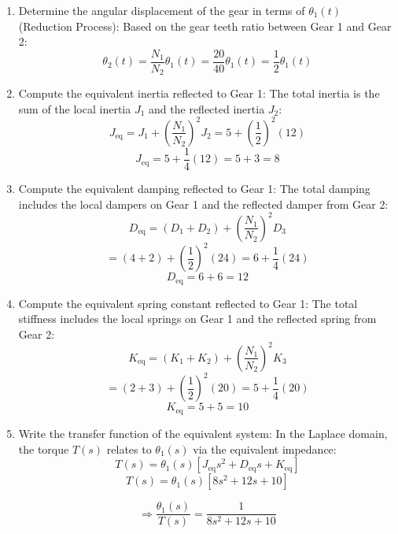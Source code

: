 \documentclass[11pt]{article}
\begin{document}
\begin{enumerate}[label=(\alph*), itemindent=*, leftmargin=*, nolistsep]
    \item Determine the angular displacement of the gear in terms of \( \theta_1(t) \) (Reduction Process):
    Based on the gear teeth ratio between Gear 1 and Gear 2:
    \[
    \theta_2(t) = \frac{N_1}{N_2} \theta_1(t) = \frac{20}{40} \theta_1(t) = \frac{1}{2} \theta_1(t)
    \]

    \item Compute the equivalent inertia reflected to Gear 1:
    The total inertia is the sum of the local inertia $J_1$ and the reflected inertia $J_2$:
    \[
    J_{\text{eq}} = J_1 + \left(\frac{N_1}{N_2}\right)^2 J_2 = 5 + \left(\frac{1}{2}\right)^2 (12)
    \]
    \[
    J_{\text{eq}} = 5 + \frac{1}{4}(12) = 5 + 3 = \boxed{8}
    \]

    \item Compute the equivalent damping reflected to Gear 1:
    The total damping includes the local dampers on Gear 1 and the reflected damper from Gear 2:
    \[
    D_{\text{eq}} = (D_1 + D_2) + \left(\frac{N_1}{N_2}\right)^2 D_3
    \]
    \[
    = (4 + 2) + \left(\frac{1}{2}\right)^2 (24) = 6 + \frac{1}{4}(24)
    \]
    \[
    D_{\text{eq}} = 6 + 6 = \boxed{12}
    \]

    \item Compute the equivalent spring constant reflected to Gear 1:
    The total stiffness includes the local springs on Gear 1 and the reflected spring from Gear 2:
    \[
    K_{\text{eq}} = (K_1 + K_2) + \left(\frac{N_1}{N_2}\right)^2 K_3
    \]
    \[
    = (2 + 3) + \left(\frac{1}{2}\right)^2 (20) = 5 + \frac{1}{4}(20)
    \]
    \[
    K_{\text{eq}} = 5 + 5 = \boxed{10}
    \]

    \item Write the transfer function of the equivalent system:
    In the Laplace domain, the torque $T(s)$ relates to $\theta_1(s)$ via the equivalent impedance:
    \[
    T(s) = \theta_1(s) \left[ J_{\text{eq}} s^2 + D_{\text{eq}} s + K_{\text{eq}} \right]
    \]
    \[
    T(s) = \theta_1(s) \left[ 8 s^2 + 12 s + 10 \right]
    \]

    \[
    \Rightarrow \boxed{
    \frac{\theta_1(s)}{T(s)} = \frac{1}{8 s^2 + 12 s + 10}
    }
    \]
\end{enumerate}

\end{document}
